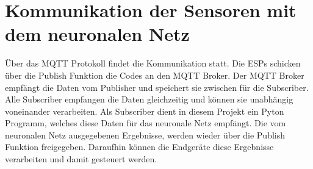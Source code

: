 \section{Kommunikation der Sensoren mit dem neuronalen Netz}
Über das MQTT Protokoll findet die Kommunikation statt. Die ESPs schicken über die Publish Funktion die Codes an den MQTT Broker. Der MQTT Broker empfängt die Daten vom Publisher und speichert sie zwischen für die Subscriber. Alle Subscriber empfangen die Daten gleichzeitig und können sie unabhängig voneinander verarbeiten. Als Subscriber dient in diesem Projekt ein Pyton Programm, welches diese Daten für das neuronale Netz empfängt. 
\newline
Die vom neuronalen Netz ausgegebenen Ergebnisse, werden wieder über die Publish Funktion freigegeben. Daraufhin können die Endgeräte diese Ergebnisse verarbeiten und damit gesteuert werden.